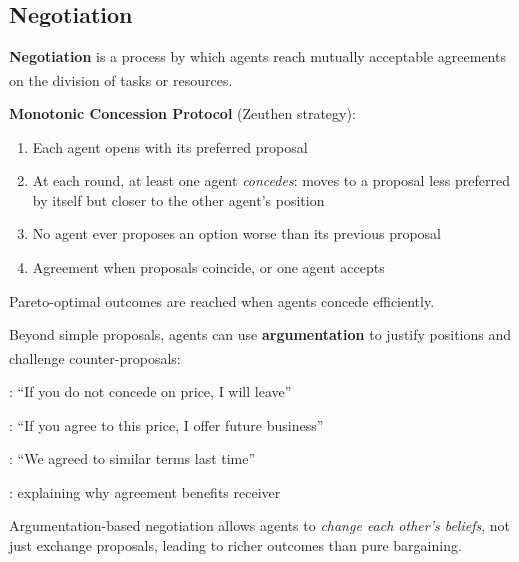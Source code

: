 \subsection{Negotiation}
\begin{tcbitemize}[ skin=sectionraster ]

    \tcbitem[title=Bargaining and Monotonic Concession, raster multicolumn=3]
    \textbf{Negotiation} is a process by which agents reach mutually acceptable
    agreements on the division of tasks or
    resources.\textsuperscript{\cite[][p.~185]{wooldridgeIntroductionMultiAgentSystems2009}}

    \textbf{Monotonic Concession Protocol} (Zeuthen strategy):
    \begin{enumerate}
        \item Each agent opens with its preferred proposal
        \item At each round, at least one agent \emph{concedes}: moves to a proposal
              less preferred by itself but closer to the other agent's position
        \item No agent ever proposes an option worse than its previous proposal
        \item Agreement when proposals coincide, or one agent accepts
    \end{enumerate}
    Pareto-optimal outcomes are reached when agents concede efficiently.

    \tcbitem[title=Argumentation-Based Negotiation, raster multicolumn=3]
    Beyond simple proposals, agents can use \textbf{argumentation} to justify
    positions and challenge counter-proposals:\textsuperscript{\cite[][p.~191]{wooldridgeIntroductionMultiAgentSystems2009}}

    \begin{description}[leftmargin=0.6cm, labelindent=0pt]
        \item[\textbf{Threats}]: ``If you do not concede on price, I will leave''
        \item[\textbf{Rewards}]: ``If you agree to this price, I offer future business''
        \item[\textbf{Appeal to precedent}]: ``We agreed to similar terms last time''
        \item[\textbf{Appeal to self-interest}]: explaining why agreement benefits receiver
    \end{description}
    Argumentation-based negotiation allows agents to \emph{change each other's beliefs},
    not just exchange proposals, leading to richer outcomes than pure bargaining.

\end{tcbitemize}

